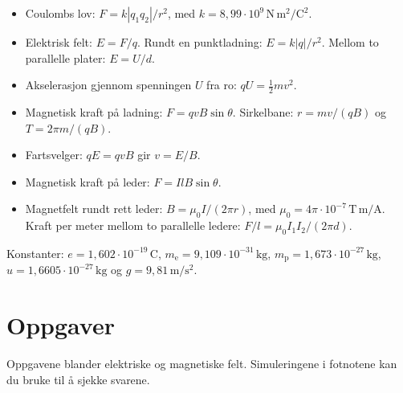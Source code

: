 \documentclass[11pt]{article}
\begin{document}
\begin{itemize}
\item Coulombs lov: $F = k |q_{1}q_{2}| / r^{2}$, med $k = 8{,}99 \cdot 10^{9}\,\mathrm{N\,m^{2}/C^{2}}$.
\item Elektrisk felt: $E = F/q$. Rundt en punktladning: $E = k|q|/r^{2}$. Mellom to parallelle plater: $E = U/d$.
\item Akselerasjon gjennom spenningen $U$ fra ro: $qU = \tfrac{1}{2}mv^{2}$.
\item Magnetisk kraft på ladning: $F = qvB \sin  θ$. Sirkelbane: $r = mv/(qB)$ og $T = 2πm/(qB)$.
\item Fartsvelger: $qE = qvB$ gir $v = E/B$.
\item Magnetisk kraft på leder: $F = IlB \sin  θ$.
\item Magnetfelt rundt rett leder: $B = μ_{0}I/(2πr)$, med $μ_{0} = 4π \cdot 10^{-7}\,\mathrm{T\,m/A}$. Kraft per meter mellom to parallelle ledere: $F/l = μ_{0}I_{1}I_{2}/(2πd)$.
\end{itemize}

Konstanter: $e = 1{,}602 \cdot 10^{-19}\,\mathrm{C}$, $m_{\mathrm{e}} = 9{,}109 \cdot 10^{-31}\,\mathrm{kg}$, $m_{\mathrm{p}} = 1{,}673 \cdot 10^{-27}\,\mathrm{kg}$, $u = 1{,}6605 \cdot 10^{-27}\,\mathrm{kg}$ og $g = 9{,}81\,\mathrm{m/s^{2}}$.

\section*{Oppgaver}

Oppgavene blander elektriske og magnetiske felt. Simuleringene i fotnotene kan du bruke til å sjekke svarene.
\end{document}
